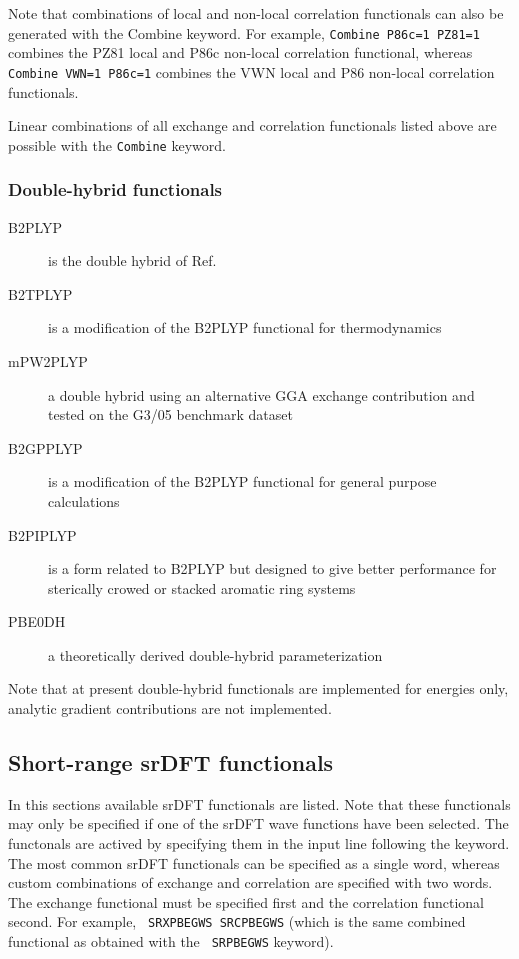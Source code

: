 Note that combinations of local and non-local correlation functionals
can also be generated with the Combine keyword. For example,
\verb|Combine P86c=1 PZ81=1| combines the PZ81 local and P86c non-local 
correlation functional, whereas \verb|Combine VWN=1 P86c=1| 
combines the VWN local and P86 non-local correlation functionals.


Linear combinations of all exchange and correlation functionals listed above
are possible with the \verb|Combine| keyword.

\subsubsection{Double-hybrid functionals}
\begin{description}
\item[B2PLYP] is the double hybrid of Ref.~\cite{dft:b2plyp}

\item[B2TPLYP] is a modification of the B2PLYP functional for thermodynamics~\cite{dft:b2tplyp}

\item[mPW2PLYP] a double hybrid using an alternative GGA exchange contribution and tested on the G3/05 benchmark dataset~\cite{dft:mpw2plyp}

\item[B2GPPLYP] is a modification of the B2PLYP functional for general purpose calculations~\cite{dft:b2tplyp}

\item[B2PIPLYP] is a form related to B2PLYP but designed to give better performance for sterically crowed or stacked aromatic ring systems~\cite{dft:b2piplyp}

\item[PBE0DH] a theoretically derived double-hybrid parameterization~\cite{dft:pbe0dh}

\end{description}

Note that at present double-hybrid functionals are implemented for energies only, analytic gradient contributions are not implemented.
\pagebreak[3]

\subsection{\label{ref-srdft}Short-range srDFT functionals}

In this sections available srDFT functionals are listed.
Note that these functionals may only be specified if one of the 
srDFT wave functions have been selected.
The functonals are actived by specifying them in the input line following the  keyword.
The most common srDFT functionals can be specified as a single word, whereas custom combinations of exchange and correlation are specified with two words.
The exchange functional must be specified first and the correlation functional second.
For example, \verb| SRXPBEGWS SRCPBEGWS| (which is the same combined functional as obtained with the \verb| SRPBEGWS| keyword).

